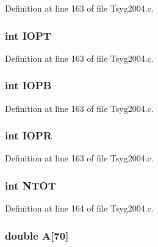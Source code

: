 Definition at line 163 of file Tsyg2004.c.\hypertarget{struct___t_s04_info_9a0935747b885ca88e6e635b0ba85be7}{
\subsubsection[{IOPT}]{\setlength{\rightskip}{0pt plus 5cm}int {\bf IOPT}}}
\label{struct___t_s04_info_9a0935747b885ca88e6e635b0ba85be7}




Definition at line 163 of file Tsyg2004.c.\hypertarget{struct___t_s04_info_d288271af02815f7cab79e1d9d16827c}{
\subsubsection[{IOPB}]{\setlength{\rightskip}{0pt plus 5cm}int {\bf IOPB}}}
\label{struct___t_s04_info_d288271af02815f7cab79e1d9d16827c}




Definition at line 163 of file Tsyg2004.c.\hypertarget{struct___t_s04_info_6707cabde8b700cd0ded61d69a272960}{
\subsubsection[{IOPR}]{\setlength{\rightskip}{0pt plus 5cm}int {\bf IOPR}}}
\label{struct___t_s04_info_6707cabde8b700cd0ded61d69a272960}




Definition at line 163 of file Tsyg2004.c.\hypertarget{struct___t_s04_info_459caca3342bee05a2b76c6df3e085f3}{
\subsubsection[{NTOT}]{\setlength{\rightskip}{0pt plus 5cm}int {\bf NTOT}}}
\label{struct___t_s04_info_459caca3342bee05a2b76c6df3e085f3}




Definition at line 164 of file Tsyg2004.c.\hypertarget{struct___t_s04_info_8e2788d33afba470d0eaf0adef38d288}{
\subsubsection[{A}]{\setlength{\rightskip}{0pt plus 5cm}double {\bf A}\mbox{[}70\mbox{]}}}
\label{struct___t_s04_info_8e2788d33afba470d0eaf0adef38d288}




